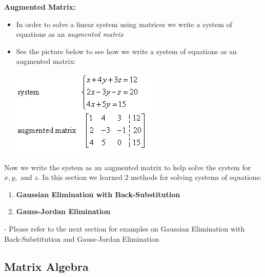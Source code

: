 \documentclass[12pt]{article}
\begin{document}
\textbf{Augmented Matrix:}

\begin{itemize}
\item In order to solve a linear system using matrices we write a system of equations as an \textit{augmented matrix}
\item See the picture below to see how we write a system of equations as an augmented matrix:
\newline

\centerline{\includegraphics{AugmentedMatrix.jpg}}
\end{itemize}

Now we write the system as an augmented matrix to help solve the system for $x,y,$ and $z$. In this section we learned 2 methods for solving systems of equations:

\begin{enumerate}
\item \textbf{Gaussian Elimination with Back-Substitution}
\item \textbf{Gauss-Jordan Elimination}
\end{enumerate}

- Please refer to the next section for examples on Gaussian Elimination with Back-Substitution and Gauss-Jordan Elimination

\subsection{Matrix Algebra}
\end{document}
